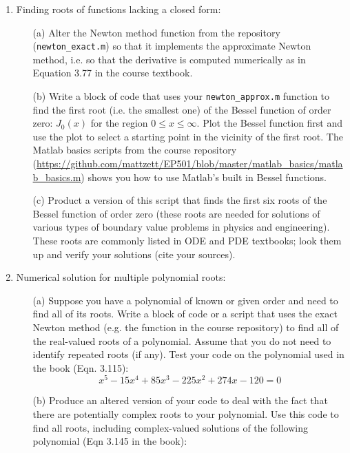 \documentclass{article}
\begin{document}
\pagebreak

\begin{enumerate}
  \item Finding roots of functions lacking a closed form:  
  \begin{itemize}
    \item[(a)]  Alter the Newton method function from the repository (\texttt{newton\_exact.m}) so that it implements the approximate Newton method, i.e. so that the derivative is computed numerically as in Equation 3.77 in the course textbook.  
    \item[(b)]  Write a block of code that uses your \texttt{newton\_approx.m} function to find the first root (i.e. the smallest one) of the Bessel function of order zero: $J_0(x)$ for the region $0 \le x \le \infty$.  Plot the Bessel function first and use the plot to select a starting point in the vicinity of the first root.  The Matlab basics scripts from the course repository (\url{https://github.com/mattzett/EP501/blob/master/matlab_basics/matlab_basics.m}) shows you how to use Matlab's built in Bessel functions.   
    \item[(c)]  Product a version of this script that finds the first six roots of the Bessel function of order zero (these roots are needed for solutions of various types of boundary value problems in physics and engineering).  These roots are commonly listed in ODE and PDE textbooks; look them up and verify your solutions (cite your sources).  
  \end{itemize} 
  \item Numerical solution for multiple polynomial roots:
  \begin{itemize}
    \item[(a)]  Suppose you have a polynomial of known or given order and need to find all of its roots.  Write a block of code or a script that uses the exact Newton method (e.g. the function in the course repository) to find all of the real-valued roots of a polynomial.  Assume that you do not need to identify repeated roots (if any).  Test your code on the polynomial used in the book (Eqn. 3.115):
    \begin{equation}
      x^5-15x^4+85x^3-225x^2+274x-120=0 \label{eqn:highpoly}
    \end{equation}
    \item[(b)]  Produce an altered version of your code to deal with the fact that there are potentially complex roots to your polynomial.  Use this code to find all roots, including complex-valued solutions of the following polynomial (Eqn 3.145 in the book):

\end{itemize}
\end{enumerate}
\end{document}
